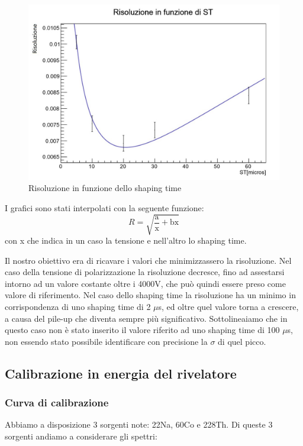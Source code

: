 \documentclass[a4paper,10pt]{article}
\begin{document}
\begin{figure}[h!]
    \centering
    \includegraphics[scale=0.45]{grafici/risoluzionest}
    \caption{Risoluzione in funzione dello shaping time}
\end{figure}

I grafici sono stati interpolati con la seguente funzione: 
\begin{equation}
	R=\sqrt{\frac{\textrm{a}}{\textrm{x}}+\textrm{bx}}
\end{equation}
con x che indica in un caso la tensione e nell'altro lo shaping time.

Il nostro obiettivo era di ricavare i valori che minimizzassero la risoluzione. Nel caso della tensione di polarizzazione la risoluzione decresce, fino ad assestarsi intorno ad un valore costante oltre i 4000V, che pu\`o quindi essere preso come valore di riferimento. Nel caso dello shaping time la risoluzione ha un minimo in corrispondenza di uno shaping time di 2 $\mu$s, ed oltre quel valore torna a crescere, a causa del pile-up che diventa sempre pi\`u significativo. Sottolineaiamo che in questo caso non \`e stato inserito il valore riferito ad uno shaping time di 100 $\mu$s, non essendo stato possibile identificare con precisione la $\sigma$ di quel picco.
\subsection{Calibrazione in energia del rivelatore}


\subsubsection{Curva di calibrazione}
Abbiamo a disposizione 3 sorgenti note: 22Na, 60Co e 228Th. Di queste 3 sorgenti andiamo a considerare gli spettri:
\end{document}

